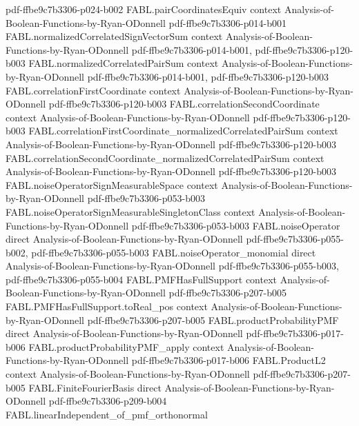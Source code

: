 \begin{theorem}
  {pdf-ffbe9c7b3306-p024-b002}
\proofstep
  {FABL.pairCoordinatesEquiv}
  {context}
  {Analysis-of-Boolean-Functions-by-Ryan-ODonnell}
  {pdf-ffbe9c7b3306-p014-b001}
\proofstep
  {FABL.normalizedCorrelatedSignVectorSum}
  {context}
  {Analysis-of-Boolean-Functions-by-Ryan-ODonnell}
  {pdf-ffbe9c7b3306-p014-b001,
    pdf-ffbe9c7b3306-p120-b003}
\proofstep
  {FABL.normalizedCorrelatedPairSum}
  {context}
  {Analysis-of-Boolean-Functions-by-Ryan-ODonnell}
  {pdf-ffbe9c7b3306-p014-b001,
    pdf-ffbe9c7b3306-p120-b003}
\proofstep
  {FABL.correlationFirstCoordinate}
  {context}
  {Analysis-of-Boolean-Functions-by-Ryan-ODonnell}
  {pdf-ffbe9c7b3306-p120-b003}
\proofstep
  {FABL.correlationSecondCoordinate}
  {context}
  {Analysis-of-Boolean-Functions-by-Ryan-ODonnell}
  {pdf-ffbe9c7b3306-p120-b003}
\proofstep
  {FABL.correlationFirstCoordinate_normalizedCorrelatedPairSum}
  {context}
  {Analysis-of-Boolean-Functions-by-Ryan-ODonnell}
  {pdf-ffbe9c7b3306-p120-b003}
\proofstep
  {FABL.correlationSecondCoordinate_normalizedCorrelatedPairSum}
  {context}
  {Analysis-of-Boolean-Functions-by-Ryan-ODonnell}
  {pdf-ffbe9c7b3306-p120-b003}
\proofstep
  {FABL.noiseOperatorSignMeasurableSpace}
  {context}
  {Analysis-of-Boolean-Functions-by-Ryan-ODonnell}
  {pdf-ffbe9c7b3306-p053-b003}
\proofstep
  {FABL.noiseOperatorSignMeasurableSingletonClass}
  {context}
  {Analysis-of-Boolean-Functions-by-Ryan-ODonnell}
  {pdf-ffbe9c7b3306-p053-b003}
\proofstep
  {FABL.noiseOperator}
  {direct}
  {Analysis-of-Boolean-Functions-by-Ryan-ODonnell}
  {pdf-ffbe9c7b3306-p055-b002,
    pdf-ffbe9c7b3306-p055-b003}
\proofstep
  {FABL.noiseOperator_monomial}
  {direct}
  {Analysis-of-Boolean-Functions-by-Ryan-ODonnell}
  {pdf-ffbe9c7b3306-p055-b003,
    pdf-ffbe9c7b3306-p055-b004}
\proofstep
  {FABL.PMFHasFullSupport}
  {context}
  {Analysis-of-Boolean-Functions-by-Ryan-ODonnell}
  {pdf-ffbe9c7b3306-p207-b005}
\proofstep
  {FABL.PMFHasFullSupport.toReal_pos}
  {context}
  {Analysis-of-Boolean-Functions-by-Ryan-ODonnell}
  {pdf-ffbe9c7b3306-p207-b005}
\proofstep
  {FABL.productProbabilityPMF}
  {direct}
  {Analysis-of-Boolean-Functions-by-Ryan-ODonnell}
  {pdf-ffbe9c7b3306-p017-b006}
\proofstep
  {FABL.productProbabilityPMF_apply}
  {context}
  {Analysis-of-Boolean-Functions-by-Ryan-ODonnell}
  {pdf-ffbe9c7b3306-p017-b006}
\proofstep
  {FABL.ProductL2}
  {context}
  {Analysis-of-Boolean-Functions-by-Ryan-ODonnell}
  {pdf-ffbe9c7b3306-p207-b005}
\proofstep
  {FABL.FiniteFourierBasis}
  {direct}
  {Analysis-of-Boolean-Functions-by-Ryan-ODonnell}
  {pdf-ffbe9c7b3306-p209-b004}
\proofstep
  {FABL.linearIndependent_of_pmf_orthonormal}

\end{theorem}

